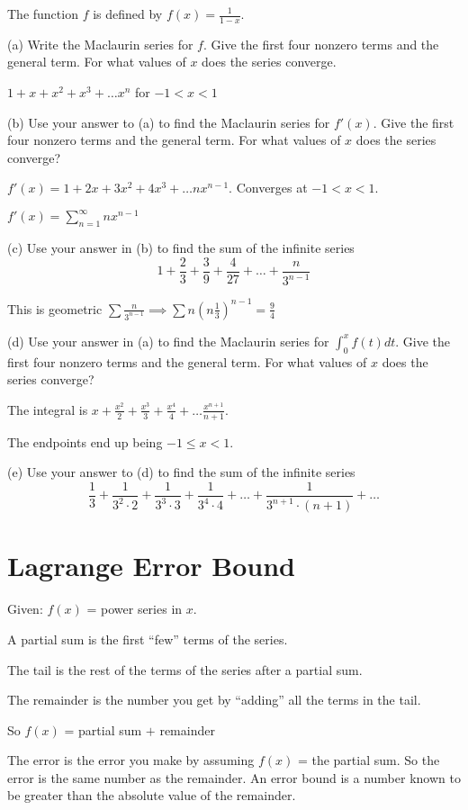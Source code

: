 \documentclass[../bccalc.tex]{subfiles}
\begin{document}
\pagebreak
\begin{example}
    The function $f$ is defined by $f(x)=\frac{1}{1-x}$.

    (a) Write the Maclaurin series for $f$. Give the first four nonzero terms and the general term. For what values of $x$ does the series converge.

    $1+x+x^2+x^3+\dots x^n$ for $-1<x<1$

    (b) Use your answer to (a) to find the Maclaurin series for $f'(x)$. Give the first four nonzero terms and the general term. For what values of $x$ does the series converge?

    $f'(x)=1+2x+3x^2+4x^3+\dots nx^{n-1}$. Converges at $-1<x<1$.

    $f'(x)=\sum_{n=1}^{\infty}nx^{n-1}$

    (c) Use your answer in (b) to find the sum of the infinite series 
    \[ 1+\frac{2}{3}+\frac{3}{9}+\frac{4}{27}+\dots + \frac{n}{3^{n-1}} \]

    This is geometric $\sum \frac{n}{3^{n-1}}\implies \sum n\left(n\frac{1}{3}\right)^{n-1}=\frac{9}{4} $

    (d) Use your answer in (a) to find the Maclaurin series for $\int_0^x f(t)dt$. Give the first four nonzero terms and the general term. For what values of $x$ does the series converge?

    The integral is $x+\frac{x^2}{2}+\frac{x^3}{3}+\frac{x^4}{4}+\dots \frac{x^{n+1}}{n+1}$.

    The endpoints end up being $-1\leq x<1$.
\end{example}

\ex (e) Use your answer to (d) to find the sum of the infinite series 
\[ \frac{1}{3}+\frac{1}{3^2\cdot 2}+\frac{1}{3^3\cdot 3}+\frac{1}{3^4\cdot 4}+\dots + \frac{1}{3^{n+1}\cdot (n+1)}+\dots \]

\section{Lagrange Error Bound}
Given: $f(x)$ = power series in $x$.

A partial sum is the first ``few'' terms of the series.

The tail is the rest of the terms of the series after a partial sum.

The remainder is the number you get by ``adding'' all the terms in the tail.

So $f(x)$ = partial sum $+$ remainder 

The error is the error you make by assuming $f(x)$ = the partial sum. So the error is the same number as the remainder. An error bound is a number 
known to be greater than the absolute value of the remainder.
\end{document}
